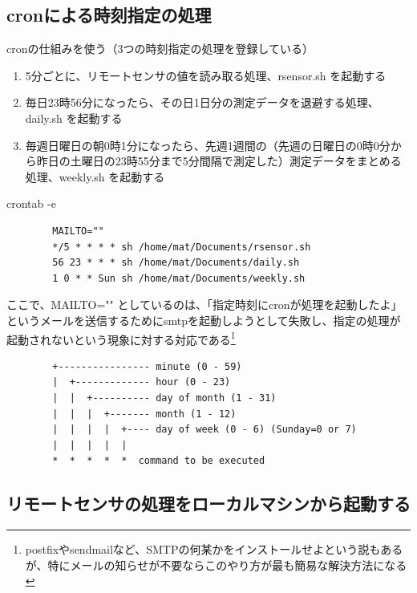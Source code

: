 \documentclass[12pt,a4paper,uplatex]{jsarticle}
\begin{document}

\newpage

\subsection{cronによる時刻指定の処理}

cronの仕組みを使う（3つの時刻指定の処理を登録している）
\begin{enumerate}
	\item[(1)] 5分ごとに、リモートセンサの値を読み取る処理、rsensor.sh を起動する
	\item[(2)] 毎日23時56分になったら、その日1日分の測定データを退避する処理、daily.sh を起動する
	\item[(3)] 毎週日曜日の朝0時1分になったら、先週1週間の（先週の日曜日の0時0分から昨日の土曜日の23時55分まで5分間隔で測定した）測定データをまとめる処理、weekly.sh を起動する
\end{enumerate}

\begin{itembox}[l]{crontab -e}
	\begin{verbatim}
		MAILTO=""
		*/5 * * * * sh /home/mat/Documents/rsensor.sh
		56 23 * * * sh /home/mat/Documents/daily.sh
		1 0 * * Sun sh /home/mat/Documents/weekly.sh
	\end{verbatim}
\end{itembox}

ここで、MAILTO="" としているのは、「指定時刻にcronが処理を起動したよ」というメールを送信するためにsmtpを起動しようとして失敗し、指定の処理が起動されないという現象に対する対応である\footnote{postfixやsendmailなど、SMTPの何某かをインストールせよという説もあるが、特にメールの知らせが不要ならこのやり方が最も簡易な解決方法になる}

\begin{screen}
	\begin{verbatim}
		+---------------- minute (0 - 59)
		|  +------------- hour (0 - 23)
		|  |  +---------- day of month (1 - 31)
		|  |  |  +------- month (1 - 12)
		|  |  |  |  +---- day of week (0 - 6) (Sunday=0 or 7)
		|  |  |  |  |
		*  *  *  *  *  command to be executed
	\end{verbatim}
\end{screen}

\newpage

\subsection{リモートセンサの処理をローカルマシンから起動する}
\end{document}
